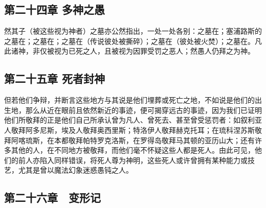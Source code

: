 
\subsection{第二十四章 多神之愚}

然其子（被这些视为神者）之墓亦公然指出，一处一处各别：之墓在；塞浦路斯的之墓在；之墓在；之墓在（传说彼处被撕碎）；之墓在（彼处被火焚）；之墓在。凡此诸神，非仅被视为已死之人，且被视为因罪受罚之恶人；然愚人仍拜之为神。\par


\subsection{第二十五章 死者封神}

但若他们争辩，并断言这些地方与其说是他们埋葬或死亡之地，不如说是他们的出生地，那么从近在眼前且依然新近的事迹，便可揭穿远古的事迹，因为我们已证明他们所敬拜的正是他们自己所承认曾为凡人、曾死去、甚至曾受惩罚者：如叙利亚人敬拜阿多尼斯，埃及人敬拜奥西里斯；特洛伊人敬拜赫克托耳；在琉科涅苏斯敬拜阿喀琉斯，在本都敬拜帕特罗克洛斯，在罗得岛敬拜马其顿的亚历山大；还有许多其他的人，在不同地方被敬拜，而他们毫不怀疑这些人都是死人。由此可见，他们的前人亦陷入同样错误，将死人尊为神明，这些死人或许曾拥有某种能力或技艺，尤其是曾以魔法幻象迷惑愚钝之人。\par


\subsection{第二十六章　变形记}

\par

